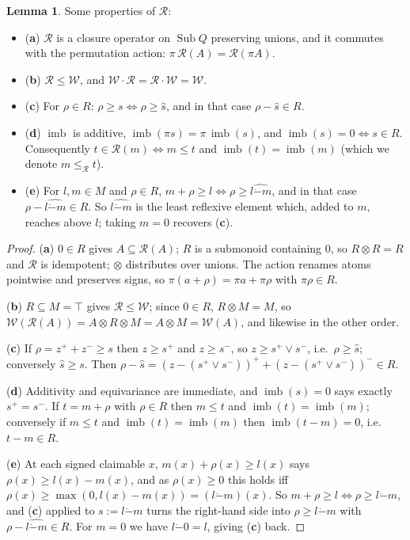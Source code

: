 \documentclass{article}
\theoremstyle{definition}
\newtheorem{lemma}{Lemma}[section]
\newcommand{\cR}{\mathcal{R}}
\newcommand{\cW}{\mathcal{W}}
\newcommand{\Sub}{\operatorname{Sub}}
\newcommand{\monus}{\mathbin{\dot-}}
\newcommand{\imb}{\operatorname{imb}}
\begin{document}
\begin{lemma}
    \label{lemma:reflprops}
    Some properties of $\cR$:
    \begin{itemize}
        \item ({\bf a}) $\cR$ is a closure operator on $\Sub Q$ preserving unions, and it commutes with the permutation action: $\pi\,\cR(A)=\cR(\pi A)$.
        \item  ({\bf b}) $\cR \leq \cW$, and $\cW\cdot\cR = \cR\cdot\cW = \cW$.
        \item ({\bf c}) For $\rho \in R$: $\rho \geq s \iff \rho \geq \hat s$, and in that case $\rho - \hat s \in R$.
        \item  ({\bf d}) $\imb$ is additive, $\imb(\pi s)=\pi\,\imb(s)$, and $\imb(s)=0 \iff s \in R$. Consequently $t \in \cR(m) \iff m \leq t$ and $\imb(t)=\imb(m)$ (which we denote $m\leq_\cR t$).
        \item ({\bf e}) For $l,m\in M$ and $\rho\in R$, $m+\rho\geq l \iff \rho\geq\widehat{l\monus m}$, and in that case $\rho-\widehat{l\monus m}\in R$. So $\widehat{l\monus m}$ is the least reflexive element which, added to $m$, reaches above $l$; taking $m=0$ recovers ({\bf c}).
    \end{itemize}
\end{lemma}
\begin{proof}
({\bf a}) $0 \in R$ gives $A \subseteq \cR(A)$; $R$ is a submonoid containing $0$, so $R\otimes R=R$ and $\cR$ is idempotent; $\otimes$ distributes over unions. The action renames atoms pointwise and preserves signs, so $\pi(a+\rho)=\pi a+\pi\rho$ with $\pi\rho\in R$.

({\bf b}) $R\subseteq M=\top$ gives $\cR\leq\cW$; since $0\in R$, $R\otimes M=M$, so $\cW(\cR(A))=A\otimes R\otimes M=A\otimes M=\cW(A)$, and likewise in the other order.

({\bf c}) If $\rho=z^++z^-\geq s$ then $z\geq s^+$ and $z\geq s^-$, so $z\geq s^+\vee s^-$, i.e.\ $\rho\geq\hat s$; conversely $\hat s\geq s$. Then $\rho-\hat s=(z-(s^+\vee s^-))^++(z-(s^+\vee s^-))^-\in R$.

({\bf d}) Additivity and equivariance are immediate, and $\imb(s)=0$ says exactly $s^+=s^-$. If $t=m+\rho$ with $\rho\in R$ then $m\leq t$ and $\imb(t)=\imb(m)$; conversely if $m\leq t$ and $\imb(t)=\imb(m)$ then $\imb(t-m)=0$, i.e.\ $t-m\in R$.

({\bf e}) At each signed claimable $x$, $m(x)+\rho(x)\geq l(x)$ says $\rho(x)\geq l(x)-m(x)$, and as $\rho(x)\geq0$ this holds iff $\rho(x)\geq\max(0,l(x)-m(x))=(l\monus m)(x)$. So $m+\rho\geq l\iff\rho\geq l\monus m$, and ({\bf c}) applied to $s:=l\monus m$ turns the right-hand side into $\rho\geq\widehat{l\monus m}$ with $\rho-\widehat{l\monus m}\in R$. For $m=0$ we have $l\monus 0=l$, giving ({\bf c}) back.
\end{proof}
\end{document}
